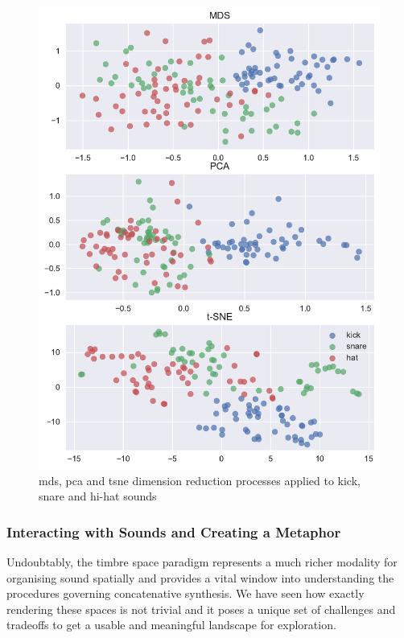 \begin{figure}
	\begin{center}
		\includegraphics[width=1.0\textwidth]{ch06_rhythmcat/figures/dimension_reductions.pdf}
	\end{center}
	\caption[MDS, PCA and t-SNE Dimension Reduction on kick,snare and hat sounds]{\acrshort{mds}, \acrshort{pca} and \acrshort{tsne} dimension reduction processes applied to kick, snare and hi-hat sounds}
	\label{fig:dimension_reductions}
\end{figure}

\subsubsection{Interacting with Sounds and Creating a Metaphor}

\label{sec:interact_metaphor}

Undoubtably, the timbre space paradigm represents a much richer modality for organising sound spatially and provides a vital window into understanding the procedures governing concatenative synthesis. We have seen how exactly rendering these spaces is not trivial and it poses a unique set of challenges and tradeoffs to get a usable and meaningful landscape for exploration.

